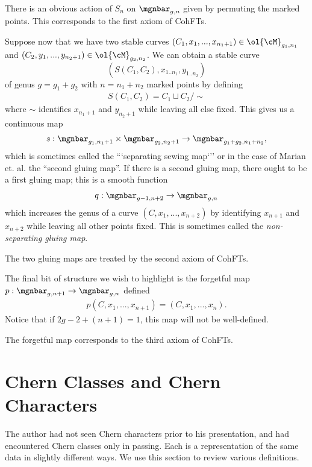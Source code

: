 \documentclass[raggedright, nofonts, notitlepage, openany, debug]{tufte-book}
\begin{document}
\begin{rmk}
  There is an obvious action of $S_n$ on $\mgnbar_{g,n}$ given by permuting the marked points. This corresponds to the first axiom of CohFTs.
\end{rmk}

Suppose now that we have two stable curves $(C_1,x_1,...,x_{n_1+1}) \in \ol{\cM}_{g_1,n_1}$ and $(C_2,y_1,...,y_{n_2+1}) \in \ol{\cM}_{g_2, n_2}$. We can obtain a stable curve $$(S(C_1, C_2),x_{1..n_1}, y_{1..n_2})$$ of genus $g = g_1 + g_2$ with $n = n_1 + n_2$ marked points by defining
\begin{align*}
  S(C_1,C_2) = C_1 \sqcup C_2/\sim
\end{align*}
where $\sim$ identifies $x_{n_1 + 1}$ and $y_{n_2 + 1}$ while leaving all else fixed. This gives us a continuous map
\begin{align*}
  s: \mgnbar_{g_1,n_1 + 1} \times \mgnbar_{g_2,n_2+1} \to \mgnbar_{g_1 + g_2,n_1 + n_2},
\end{align*}
which is sometimes called the ```separating sewing map`'' or in the case of Marian et. al. the ``second gluing map''. If there is a second gluing map, there ought to be a first gluing map; this is a smooth function
\begin{align*}
  q: \mgnbar_{g-1,n+2} \to \mgnbar_{g,n}
\end{align*}
which increases the genus of a curve $(C,x_1,...,x_{n+2})$ by identifying $x_{n+1}$ and $x_{n+2}$ while leaving all other points fixed. This is sometimes called the \emph{non-separating gluing map}.
\begin{rmk}
  The two gluing maps are treated by the second axiom of CohFTs.
\end{rmk}

The final bit of structure we wish to highlight is the forgetful map $p:\mgnbar_{g,n+1} \to \mgnbar_{g,n}$ defined
\begin{align*}
  p(C,x_1,...,x_{n+1}) = (C,x_1,...,x_n).
\end{align*}
Notice that if $2g - 2 + (n+1) = 1$, this map will not be well-defined.

\begin{rmk}
  The forgetful map corresponds to the third axiom of CohFTs.
\end{rmk}

\section{Chern Classes and Chern Characters}
The author had not seen Chern characters prior to his presentation, and had encountered Chern classes only in passing. Each is a representation of the same data in slightly different ways. We use this section to review various definitions.
\end{document}
